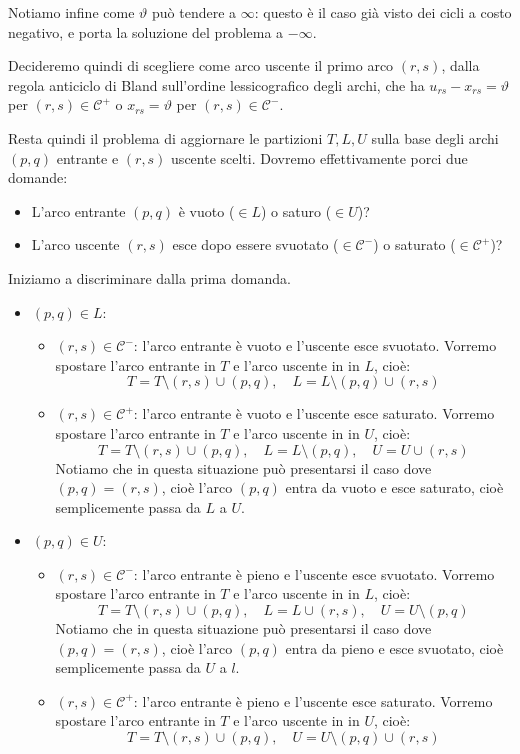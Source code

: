 \documentclass[a4paper,11pt]{article}
\begin{document}
Notiamo infine come $\vartheta$ può tendere a $\infty$: questo è il caso già visto dei cicli a costo negativo, e porta la soluzione del problema a $-\infty$.

Decideremo quindi di scegliere come arco uscente il primo arco $(r,s)$, dalla regola anticiclo di Bland sull'ordine lessicografico degli archi, che ha $u_{rs} - x_{rs} = \vartheta$ per $(r,s) \in \mathcal{C}^+$ o $x_{rs} = \vartheta$ per $(r,s) \in \mathcal{C}^-$.

Resta quindi il problema di aggiornare le partizioni $T, L, U$ sulla base degli archi $(p,q)$ entrante e $(r,s)$ uscente scelti.
Dovremo effettivamente porci due domande:
\begin{itemize}
	\item L'arco entrante $(p,q)$ è vuoto ($\in L$) o saturo ($\in U$)?
	\item L'arco uscente $(r,s)$ esce dopo essere svuotato ($\in \mathcal{C}^-$) o saturato ($\in \mathcal{C}^+$)?
\end{itemize}

Iniziamo a discriminare dalla prima domanda.
\begin{itemize}
	\item $(p, q) \in L$: 
		\begin{itemize}
			\item $(r,s) \in \mathcal{C}^-$: l'arco entrante è vuoto e l'uscente esce svuotato. Vorremo spostare l'arco entrante in $T$ e l'arco uscente in in $L$, cioè:
				$$ T = T \setminus (r,s) \cup (p,q), \quad L = L \setminus (p, q) \cup (r,s) $$
			\item $(r,s) \in \mathcal{C}^+$: l'arco entrante è vuoto e l'uscente esce saturato. Vorremo spostare l'arco entrante in $T$ e l'arco uscente in in $U$, cioè:
				$$ T = T \setminus (r,s) \cup (p,q), \quad L = L \setminus (p, q), \quad U = U \cup (r, s) $$
				Notiamo che in questa situazione può presentarsi il caso dove $(p,q) = (r,s)$, cioè l'arco $(p,q)$ entra da vuoto e esce saturato, cioè semplicemente passa da $L$ a $U$.
		\end{itemize}
	\item $(p,q) \in U$:
		\begin{itemize}
			\item $(r,s) \in \mathcal{C}^-$: l'arco entrante è pieno e l'uscente esce svuotato. Vorremo spostare l'arco entrante in $T$ e l'arco uscente in in $L$, cioè:
				$$ T = T \setminus (r,s) \cup (p,q), \quad L = L \cup (r,s), \quad U = U \setminus (p,q) $$
				Notiamo che in questa situazione può presentarsi il caso dove $(p,q) = (r,s)$, cioè l'arco $(p,q)$ entra da pieno e esce svuotato, cioè semplicemente passa da $U$ a $l$.
			\item $(r,s) \in \mathcal{C}^+$: l'arco entrante è pieno e l'uscente esce saturato. Vorremo spostare l'arco entrante in $T$ e l'arco uscente in in $U$, cioè:
				$$ T = T \setminus (r,s) \cup (p,q), \quad U = U \setminus (p, q) \cup (r,s) $$
		\end{itemize}
\end{itemize}
\end{document}
